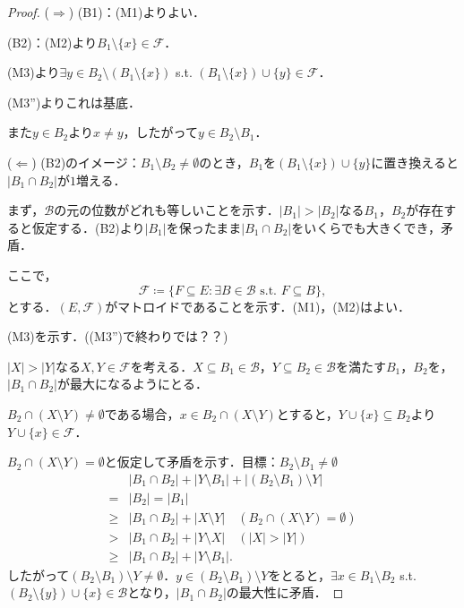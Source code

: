 \documentclass[xelatex,ja=standard,a4paper,14pt,everyparhook=compat]{bxjsarticle}
\theoremstyle{definition}
\begin{document}
\begin{proof}
    ($\Longrightarrow$)
    (B1)：(M1)よりよい．

    (B2)：(M2)より$B_1 \setminus \{x\} \in \mathcal{F}$．

    (M3)より$\exists y \in B_2 \setminus (B_1 \setminus \{x\})$ s.t. $(B_1 \setminus \{x\}) \cup \{y\} \in \mathcal{F}$．

    (M3'')よりこれは基底．

    また$y \in B_2$より$x \neq y$，したがって$y \in B_2 \setminus B_1$．

    ($\Longleftarrow$)
    (B2)のイメージ：$B_1 \setminus B_2 \neq \emptyset$のとき，$B_1$を$(B_1 \setminus \{x\}) \cup \{y\}$に置き換えると$|B_1 \cap B_2|$が$1$増える．

    まず，$\mathcal{B}$の元の位数がどれも等しいことを示す．$|B_1| > |B_2|$なる$B_1$，$B_2$が存在すると仮定する．(B2)より$|B_1|$を保ったまま$|B_1 \cap B_2|$をいくらでも大きくでき，矛盾．

    ここで，
    \begin{equation*}
        \mathcal{F} \coloneqq \{F \subseteq E : \text{$\exists B \in \mathcal{B}$ s.t. $F \subseteq B$}\},
    \end{equation*}
    とする．$(E, \mathcal{F})$がマトロイドであることを示す．(M1)，(M2)はよい．

    (M3)を示す．((M3'')で終わりでは？？)

    $|X| > |Y|$なる$X, Y \in \mathcal{F}$を考える．$X \subseteq B_1 \in \mathcal{B}$，$Y \subseteq B_2 \in \mathcal{B}$を満たす$B_1$，$B_2$を，$|B_1 \cap B_2|$が最大になるようにとる．

    $B_2 \cap (X \setminus Y) \neq \emptyset$である場合，$x \in B_2 \cap (X \setminus Y)$とすると，$Y \cup \{x\} \subseteq B_2$より$Y \cup \{x\} \in \mathcal{F}$．

    $B_2 \cap (X \setminus Y) = \emptyset$と仮定して矛盾を示す．目標：$B_2 \setminus B_1 \neq \emptyset$ \begin{align*}
               & |B_1 \cap B_2| + |Y \setminus B_1| + |(B_2 \setminus B_1) \setminus Y|        \\
        ={}    & |B_2| = |B_1|                                                                 \\
        \geq{} & |B_1 \cap B_2| + |X \setminus Y| \quad (B_2 \cap (X \setminus Y) = \emptyset) \\
        >{}    & |B_1 \cap B_2| + |Y \setminus X| \quad (|X| > |Y|)                            \\
        \geq{} & |B_1 \cap B_2| + |Y \setminus B_1|.
    \end{align*}
    したがって$(B_2 \setminus B_1) \setminus Y \neq \emptyset$．$y \in (B_2 \setminus B_1) \setminus Y$をとると，$\exists x \in B_1 \setminus B_2$ s.t. $(B_2 \setminus \{y\}) \cup \{x\} \in \mathcal{B}$となり，$|B_1 \cap B_2|$の最大性に矛盾．
\end{proof}
\end{document}
